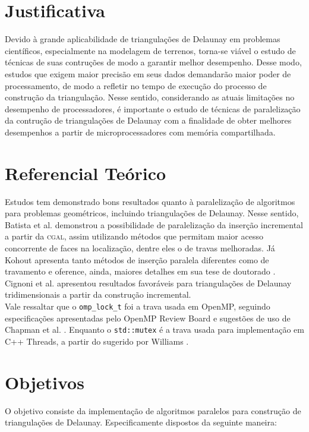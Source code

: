 \documentclass[a4paper, 12pt]{article}
\begin{document}
\section*{Justificativa}
\justify
Devido à grande aplicabilidade de triangulações de Delaunay em problemas científicos, especialmente na modelagem de terrenos,
torna-se viável o estudo de técnicas de suas contruções de modo a garantir melhor desempenho. Desse modo, estudos que exigem maior 
precisão em seus dados demandarão maior poder de processamento, de modo a refletir no tempo de execução do processo de construção da triangulação.
Nesse sentido, considerando as atuais limitações no desempenho de processadores, é importante o estudo de técnicas de paralelização 
da contrução de triangulações de Delaunay com a finalidade de obter melhores desempenhos a partir de microprocessadores 
com memória compartilhada. \\

\section*{Referencial Teórico}
Estudos tem demonstrado bons resultados quanto à paralelização de algoritmos para problemas geométricos, incluindo triangulações de 
Delaunay. Nesse sentido, Batista et al. \cite{batista} demonstrou a possibilidade de paralelização da inserção incremental a partir 
da \textsc{cgal}, assim utilizando métodos que permitam maior acesso concorrente de faces na localização, dentre eles o de 
travas melhoradas. Já Kohout \cite{kohout} apresenta tanto métodos de inserção paralela diferentes como de travamento e oference, ainda,
maiores detalhes em sua tese de doutorado \cite{kohoutthesis}. Cignoni et al. \cite{cignoni} apresentou resultados favoráveis para
triangulações de Delaunay tridimensionais a partir da construção incremental. \\

Vale ressaltar que o \texttt{omp\_lock\_t} foi a trava usada em OpenMP, seguindo especificações apresentadas pelo OpenMP Review Board
\cite{openmp_manual} e sugestões de uso de Chapman et al. \cite{chapman}. Enquanto o \texttt{std::mutex} é a trava usada para implementação
em C++ Threads, a partir do sugerido por Williams \cite{williams}. \\


\section*{Objetivos}
O objetivo consiste da implementação de algoritmos paralelos para construção de triangulações de Delaunay. Especificamente dispostos
da seguinte maneira:
\end{document}
